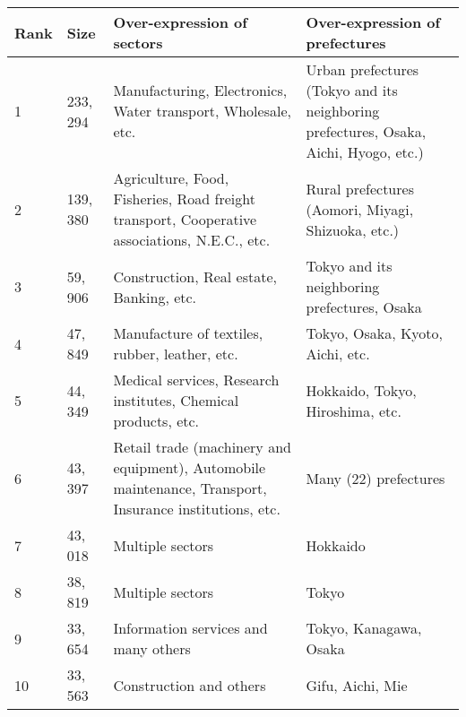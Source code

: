 \documentclass[pre,floatfix,twocolumn,showpacs,a4paper,nofootinbib]{revtex4}
\begin{document}
\begin{table*}[t] 
\begin {center}
 \scriptsize
\begin{tabular}{|l|l|p{7.5cm}|p{7.5cm}|} \hline
  Rank   & Size      & Over-expression of sectors            &  Over-expression of prefectures  \\ \hline
  1      & 233, 294   & Manufacturing, Electronics, Water transport, Wholesale, etc.   &  Urban prefectures (Tokyo and its neighboring prefectures, Osaka, Aichi, Hyogo, etc.)          \\ 
  2      & 139, 380   & Agriculture, Food, Fisheries, Road freight transport, Cooperative associations, N.E.C., etc.        & Rural prefectures (Aomori, Miyagi, Shizuoka, etc.)             \\
  3      &  59, 906   & Construction, Real estate, Banking, etc.      &  Tokyo and its neighboring prefectures, Osaka          \\
  4      &  47, 849   & Manufacture of textiles, rubber, leather, etc.        &  Tokyo, Osaka, Kyoto, Aichi, etc.           \\ 
  5      &  44, 349   & Medical services, Research institutes, Chemical products, etc.     &  Hokkaido, Tokyo, Hiroshima, etc.     \\                  
  6      &  43, 397   & Retail trade (machinery and equipment), Automobile  maintenance, Transport, Insurance institutions, etc.       & Many (22) prefectures            \\                
  7      &  43, 018   & Multiple sectors        & Hokkaido              \\         
  8      &  38, 819   & Multiple sectors       & Tokyo               \\ 
  9      &  33, 654   & Information services and many others   & Tokyo, Kanagawa, Osaka            \\
  10     &  33, 563   & Construction and others         & Gifu, Aichi, Mie                         \\ \hline
     \end{tabular}
\caption{Brief summary of our results on the over-expression of sectors and prefectures in the ten largest communities}
\label{table1}
\end {center}
\end {table*}
\end{document}
